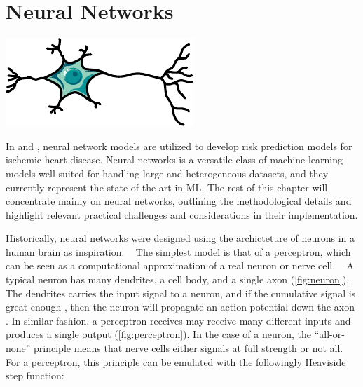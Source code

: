 \clearpage
\section{Neural Networks}

\begin{marginfigure}[3em]
	\includegraphics[width=\linewidth]{graphics/neuron}
    \caption[Schematic diagram of a neuron]{%
        Schematic diagram of a neuron.
        A typical neuron has a dendrites, a cell body, and a single axon; 
        the dendrites receive input signals from other neurons,
        and propagates output signals along the axon.
    }
    \label{fig:neuron}
\end{marginfigure}%

In \studyii{} and \studyiii{}, 
neural network models are utilized to 
develop risk prediction models for ischemic heart disease.
Neural networks is a versatile class of machine learning models
well-suited for handling large and heterogeneous datasets, 
and they currently represent the state-of-the-art in \ac{ML}.
The rest of this chapter will concentrate mainly on neural networks, 
outlining the methodological details and highlight 
relevant practical challenges and considerations 
in their implementation.

Historically, neural networks were designed
using the archicteture of neurons in a human brain as inspiration.
~\autocite{goodfellow2016deep}
The simplest model is that of a perceptron, 
which can be seen as a computational approximation
of a real neuron or nerve cell.
~\autocite{charniakIntroduction2019}
A typical neuron has many dendrites, a cell body, and a single axon 
(\cref{fig:neuron}).
The dendrites carries the input signal to a neuron,
and if the cumulative signal is great enough%
, 
then the neuron will propagate an action potential down the axon%
\autocite{seifterConcepts2005}.
In similar fashion, a perceptron receives may receive many different inputs
and produces a single output (\cref{fig:perceptron}).
In the case of a neuron, the \enquote{all-or-none} principle means
that nerve cells either signals at full strength or not all.
For a perceptron, this principle can be emulated
with the followingly Heaviside step function:
~\autocite{charniakIntroduction2019}


